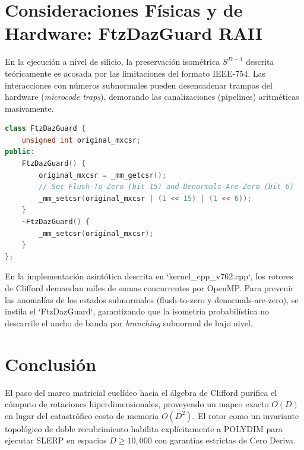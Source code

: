\section{Consideraciones Físicas y de Hardware: FtzDazGuard RAII}
En la ejecución a nivel de silicio, la preservación isométrica $S^{D-1}$ descrita teóricamente es acosada por las limitaciones del formato IEEE-754. Las interacciones con números subnormales pueden desencadenar trampas del hardware (\textit{microcode traps}), demorando las canalizaciones (pipelines) aritméticas masivamente.
\begin{lstlisting}[language=C++, caption={Protección del pipeline FPU mediante RAII en kernel\_cpp\_v762.cpp}]
class FtzDazGuard {
    unsigned int original_mxcsr;
public:
    FtzDazGuard() {
        original_mxcsr = _mm_getcsr();
        // Set Flush-To-Zero (bit 15) and Denormals-Are-Zero (bit 6)
        _mm_setcsr(original_mxcsr | (1 << 15) | (1 << 6));
    }
    ~FtzDazGuard() {
        _mm_setcsr(original_mxcsr);
    }
};
\end{lstlisting}
En la implementación asintótica descrita en `kernel_cpp_v762.cpp`, los rotores de Clifford demandan miles de sumas concurrentes por OpenMP. Para prevenir las anomalías de los estados subnormales (flush-to-zero y denormals-are-zero), se instila el `FtzDazGuard`, garantizando que la isometría probabilística no descarrile el ancho de banda por \textit{branching} subnormal de bajo nivel.

\section{Conclusión}
El paso del marco matricial euclídeo hacia el álgebra de Clifford purifica el cómputo de rotaciones hiperdimensionales, proveyendo un mapeo exacto $O(D)$ en lugar del catastrófico costo de memoria $O(D^2)$. El rotor como un invariante topológico de doble recubrimiento habilita explícitamente a POLYDIM para ejecutar SLERP en espacios $D \ge 10,000$ con garantías estrictas de Cero Deriva.

